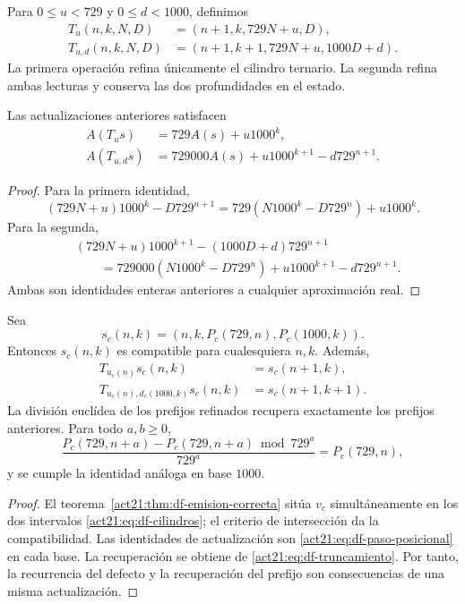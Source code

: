 \begin{definition}
Para \(0\leq u<729\) y \(0\leq d<1000\), definimos
\begin{align*}
 T_u(n,k,N,D)&=(n+1,k,729N+u,D),\\
 T_{u,d}(n,k,N,D)&=(n+1,k+1,729N+u,1000D+d).
\end{align*}
La primera operación refina únicamente el cilindro ternario. La segunda
refina ambas lecturas y conserva las dos profundidades en el estado.
\end{definition}

\begin{proposition}
\label{act21:prop:df-rec-frontera}
Las actualizaciones anteriores satisfacen
\begin{align}
 A(T_u s)&=729A(s)+u1000^k,\label{act21:eq:df-rec-ternaria}\\
 A(T_{u,d}s)&=729000A(s)+u1000^{k+1}-d729^{n+1}.
 \label{act21:eq:df-rec-conjunta}
\end{align}
\end{proposition}

\begin{proof}
Para la primera identidad,
\[
 (729N+u)1000^k-D729^{n+1}
 =729(N1000^k-D729^n)+u1000^k.
\]
Para la segunda,
\begin{align*}
 &(729N+u)1000^{k+1}-(1000D+d)729^{n+1}\\
 &\qquad=729000(N1000^k-D729^n)
      +u1000^{k+1}-d729^{n+1}.
\end{align*}
Ambas son identidades enteras anteriores a cualquier aproximación real.
\end{proof}

\begin{theorem}
\label{act21:thm:df-refinamiento-generado}
Sea
\[
 s_c(n,k)=(n,k,P_c(729,n),P_c(1000,k)).
\]
Entonces \(s_c(n,k)\) es compatible para cualesquiera \(n,k\). Además,
\begin{align*}
 T_{u_c(n)}s_c(n,k)&=s_c(n+1,k),\\
 T_{u_c(n),d_c(1000,k)}s_c(n,k)&=s_c(n+1,k+1).
\end{align*}
La división euclídea de los prefijos refinados recupera exactamente los
prefijos anteriores. Para todo \(a,b\geq0\),
\[
 \frac{P_c(729,n+a)-P_c(729,n+a)\bmod729^a}{729^a}
 =P_c(729,n),
\]
y se cumple la identidad análoga en base \(1000\).
\end{theorem}

\begin{proof}
El teorema~\ref{act21:thm:df-emision-correcta} sitúa \(v_c\) simultáneamente en
los dos intervalos \eqref{act21:eq:df-cilindros}; el criterio de intersección da
la compatibilidad. Las identidades de actualización son
\eqref{act21:eq:df-paso-posicional} en cada base. La recuperación se obtiene de
\eqref{act21:eq:df-truncamiento}. Por tanto, la recurrencia del defecto y la
recuperación del prefijo son consecuencias de una misma actualización.
\end{proof}

